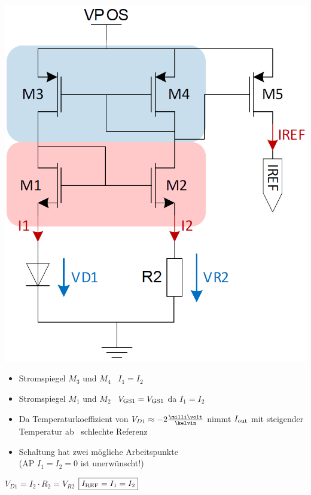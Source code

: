 \begin{minipage}[c]{0.27\columnwidth}
    \includegraphics[width=\columnwidth]{images/bootstrap.png}
\end{minipage}
\hfill
\begin{minipage}[c]{0.71\columnwidth}
    \begin{itemize}
        \item Stromspiegel $M_3$ und $M_4$ \textrightarrow\ $I_1 = I_2$
        \item Stromspiegel $M_1$ und $M_2$ \textrightarrow\ $V_{\rm GS1} = V_{\rm GS1}$ da $I_1 = I_2$
        \item Da Temperaturkoeffizient von $V_{D1} \approx -2 \frac{\milli \volt}{\kelvin}$ nimmt $I_{\rm out}$ 
        mit steigender Temperatur ab \textrightarrow\ schlechte Referenz
        \item Schaltung hat zwei mögliche Arbeitspunkte\\
        (AP $I_1 = I_2 = 0$ ist unerwünscht!)
    \end{itemize}
\end{minipage}
$ \boxed{ V_{D1} = I_2 \cdot R_2 = V_{R2}} $ $ \boxed{ I_{\rm REF} = I_1 = I_2 } $


